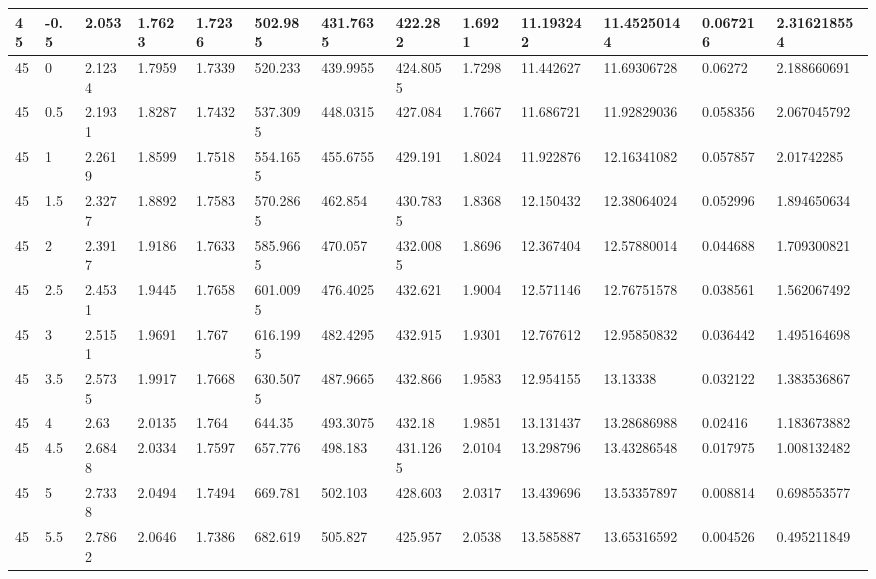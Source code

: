 \begin{longtable}{|l|l|l|l|l|l|l|l|l|l|l|l|l|}
45    & -0.5  & 2.053   & 1.7623  & 1.7236  & 502.985  & 431.7635 & 422.282  & 1.6921   & 11.193242   & 11.45250144    & 0.067216                 & 2.316218554 \\ \hline
45    & 0     & 2.1234  & 1.7959  & 1.7339  & 520.233  & 439.9955 & 424.8055 & 1.7298   & 11.442627   & 11.69306728    & 0.06272                  & 2.188660691 \\ \hline
45    & 0.5   & 2.1931  & 1.8287  & 1.7432  & 537.3095 & 448.0315 & 427.084  & 1.7667   & 11.686721   & 11.92829036    & 0.058356                 & 2.067045792 \\ \hline
45    & 1     & 2.2619  & 1.8599  & 1.7518  & 554.1655 & 455.6755 & 429.191  & 1.8024   & 11.922876   & 12.16341082    & 0.057857                 & 2.01742285  \\ \hline
45    & 1.5   & 2.3277  & 1.8892  & 1.7583  & 570.2865 & 462.854  & 430.7835 & 1.8368   & 12.150432   & 12.38064024    & 0.052996                 & 1.894650634 \\ \hline
45    & 2     & 2.3917  & 1.9186  & 1.7633  & 585.9665 & 470.057  & 432.0085 & 1.8696   & 12.367404   & 12.57880014    & 0.044688                 & 1.709300821 \\ \hline
45    & 2.5   & 2.4531  & 1.9445  & 1.7658  & 601.0095 & 476.4025 & 432.621  & 1.9004   & 12.571146   & 12.76751578    & 0.038561                 & 1.562067492 \\ \hline
45    & 3     & 2.5151  & 1.9691  & 1.767   & 616.1995 & 482.4295 & 432.915  & 1.9301   & 12.767612   & 12.95850832    & 0.036442                 & 1.495164698 \\ \hline
45    & 3.5   & 2.5735  & 1.9917  & 1.7668  & 630.5075 & 487.9665 & 432.866  & 1.9583   & 12.954155   & 13.13338       & 0.032122                 & 1.383536867 \\ \hline
45    & 4     & 2.63    & 2.0135  & 1.764   & 644.35   & 493.3075 & 432.18   & 1.9851   & 13.131437   & 13.28686988    & 0.02416                  & 1.183673882 \\ \hline
45    & 4.5   & 2.6848  & 2.0334  & 1.7597  & 657.776  & 498.183  & 431.1265 & 2.0104   & 13.298796   & 13.43286548    & 0.017975                 & 1.008132482 \\ \hline
45    & 5     & 2.7338  & 2.0494  & 1.7494  & 669.781  & 502.103  & 428.603  & 2.0317   & 13.439696   & 13.53357897    & 0.008814                 & 0.698553577 \\ \hline
45    & 5.5   & 2.7862  & 2.0646  & 1.7386  & 682.619  & 505.827  & 425.957  & 2.0538   & 13.585887   & 13.65316592    & 0.004526                 & 0.495211849 \\ \hline

\end{longtable}
